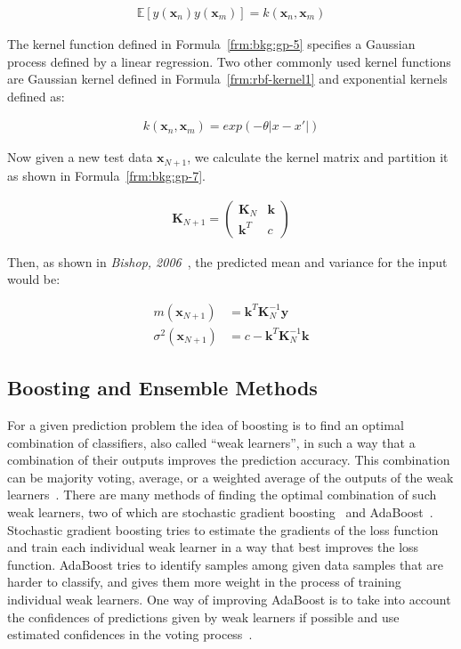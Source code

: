\begin{align}
  \mathbb{E}[y(\mathbf{x}_n)y(\mathbf{x}_m)] = k(\mathbf{x}_n,\mathbf{x}_m)
  \label{frm:bkg:gp-6}
\end{align}

The kernel function defined in Formula~\ref{frm:bkg:gp-5} specifies a Gaussian process defined by a linear regression. Two other commonly used kernel functions are Gaussian kernel defined in Formula~\ref{frm:rbf-kernel1} and exponential kernels defined as:

\begin{align}
  k(\mathbf{x}_n,\mathbf{x}_m) = exp(-\theta |x - x'|)
  \label{frm:bkg:gp-6-2}
\end{align}

Now given a new test data $\mathbf{x}_{N+1}$, we calculate the kernel matrix and partition it as shown in Formula~\ref{frm:bkg:gp-7}.

\begin{align}
  \mathbf{K}_{N+1} =
  \begin{pmatrix}
    \mathbf{K}_N & \mathbf{k} \\
    \mathbf{k}^T & c
  \end{pmatrix}
  \label{frm:bkg:gp-7}
\end{align}

Then, as shown in \emph{Bishop, 2006}~\cite[Ch. 6.4]{bishop2006pattern}, the predicted mean and variance for the input would be:

\begin{align}
  m(\mathbf{x}_{N+1}) & = \mathbf{k}^T\mathbf{K}_N^{-1}\mathbf{y} \nonumber \\
  \sigma^2(\mathbf{x}_{N+1}) & = c-\mathbf{k}^T\mathbf{K}_N^{-1}\mathbf{k}
  \label{frm:bkg:gp-8}
\end{align}


\subsection{Boosting and Ensemble Methods}
For a given prediction problem the idea of boosting is to find an optimal combination of classifiers, also called ``weak learners'', in such a way that a combination of their outputs improves the prediction accuracy. This combination can be majority voting, average, or a weighted average of the outputs of the weak learners~\cite{ensemble2002}. There are many methods of finding the optimal combination of such weak learners, two of which are stochastic gradient boosting~\cite{friedman2002stochastic} and AdaBoost~\cite{adaboost97}. Stochastic gradient boosting tries to estimate the gradients of the loss function and train each individual weak learner in a way that best improves the loss function. AdaBoost tries to identify samples among given data samples that are harder to classify, and gives them more weight in the process of training individual weak learners. One way of improving AdaBoost is to take into account the confidences of predictions given by weak learners if possible and use estimated confidences in the voting process~\cite{adaboost99improved}.

